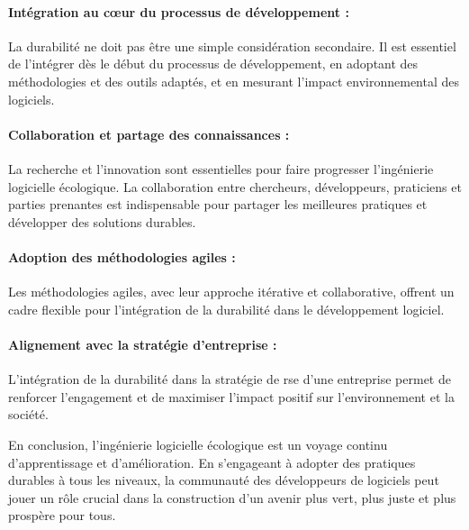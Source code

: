 \paragraph{Intégration au cœur du processus de développement :} La durabilité ne doit pas être une simple considération secondaire. Il est essentiel de l'intégrer dès le début du processus de développement, en adoptant des méthodologies et des outils adaptés, et en mesurant l'impact environnemental des logiciels.

\paragraph{Collaboration et partage des connaissances :} La recherche et l'innovation sont essentielles pour faire progresser l'ingénierie logicielle écologique. La collaboration entre chercheurs, développeurs, praticiens et parties prenantes est indispensable pour partager les meilleures pratiques et développer des solutions durables.

\paragraph{Adoption des méthodologies agiles :} Les méthodologies agiles, avec leur approche itérative et collaborative, offrent un cadre flexible pour l'intégration de la durabilité dans le développement logiciel.

\paragraph{Alignement avec la stratégie d'entreprise :} L'intégration de la durabilité dans la stratégie de \acrshort{rse} d'une entreprise permet de renforcer l'engagement et de maximiser l'impact positif sur l'environnement et la société.


En conclusion, l'ingénierie logicielle écologique est un voyage continu d'apprentissage et d'amélioration. En s'engageant à adopter des pratiques durables à tous les niveaux, la communauté des développeurs de logiciels peut jouer un rôle crucial dans la construction d'un avenir plus vert, plus juste et plus prospère pour tous.

